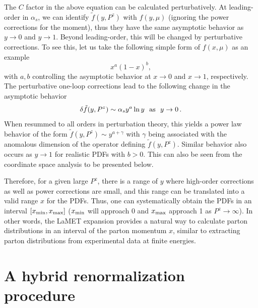 \documentclass[preprint,12pt]{elsarticle}
\begin{document}
The $C$ factor in the above equation can be calculated perturbatively. At leading-order in $\alpha_s$, we can identify $\tilde f(y, P^z)$ with $f(y,\mu)$ (ignoring the power corrections for the moment), thus they have the same asymptotic behavior as $y\to 0$ and $y\to1$. Beyond leading-order, this will be changed by perturbative corrections. To see this, let us take the following simple form of $f(x, \mu)$ as an example
\begin{equation}
x^a (1-x)^b,
\end{equation}
with $a, b$ controlling the asymptotic behavior at $x\to 0$ and $x\to 1$, respectively. The perturbative one-loop corrections lead to the following change in the asymptotic behavior
\begin{align}
\delta\tilde f(y, P^z)\sim \alpha_s y^a \ln y \ \  {\rm as}\ \  y\to 0\,.
\end{align}
When resummed to all orders in perturbation theory, this yields a power law behavior of the form $\tilde f(y, P^z)\sim  y^{a+\gamma}$ with $\gamma$ being associated with the anomalous dimension of the operator defining $\tilde f(y, P^z)$. Similar behavior also occurs as $y\to 1$ for realistic PDFs with $b>0$. This can also be seen from the coordinate space analysis to be presented below.

Therefore, for a given large $P^z$,
there is a range of $y$ where high-order corrections as well as power corrections are small, and this range can be translated into
a valid range $x$ for the PDFs. Thus, one can systematically obtain the PDFs in an interval $[x_{\rm min}, x_{\rm max}]$ ($x_{\rm min}$ will approach 0 and $x_{\rm max}$ approach 1 as $P^z\to \infty$).
In other words, the LaMET
expansion provides a natural way to calculate parton distributions
in an interval of the parton momentum $x$, similar to extracting parton distributions from
experimental data at finite energies.


\section{A hybrid renormalization procedure}
\label{sec:hybrid}
\end{document}
